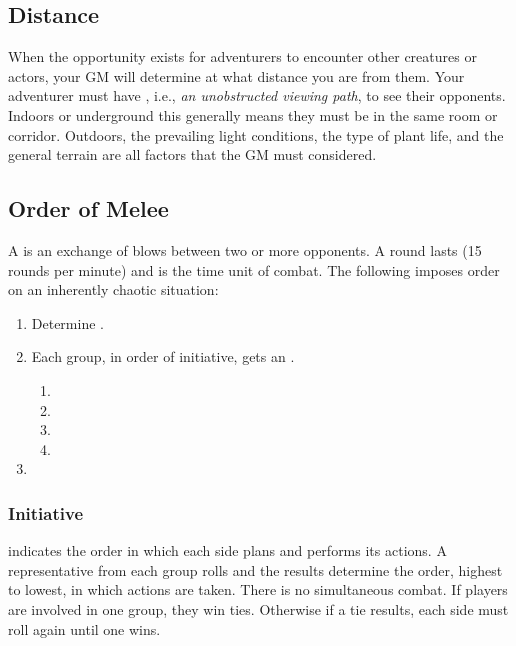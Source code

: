 \begin{multicols*}{2}
\subsection{Distance}
When the opportunity exists for adventurers to encounter other creatures or actors, your GM will determine at what distance you are from them. Your adventurer must have , i.e., \textit{an unobstructed viewing path}, to see their opponents. Indoors or underground this generally means they must be in the same room or corridor. Outdoors, the prevailing light conditions, the type of plant life, and the general terrain are all factors that the GM must considered.
\subsection{Order of Melee}
A  is an exchange of blows between two or more opponents. A round lasts  (15 rounds per minute) and is the time unit of combat. The following  imposes order on an inherently chaotic situation:
\begin{enumerate}[leftmargin=12pt]
\item Determine .
\item Each group, in order of initiative, gets an .
\begin{enumerate}[leftmargin=12pt]
\item {}
\item {}
\item {}
\item {}
\end{enumerate}
\item {}
\end{enumerate}
\subsubsection{Initiative}
 indicates the order in which each side plans and performs its actions. A representative from each group rolls  and the results determine the order, highest to lowest, in which actions are taken. There is no simultaneous combat. If players are involved in one group, they win ties. Otherwise if a tie results, each side must roll again until one wins.


\end{multicols*}
